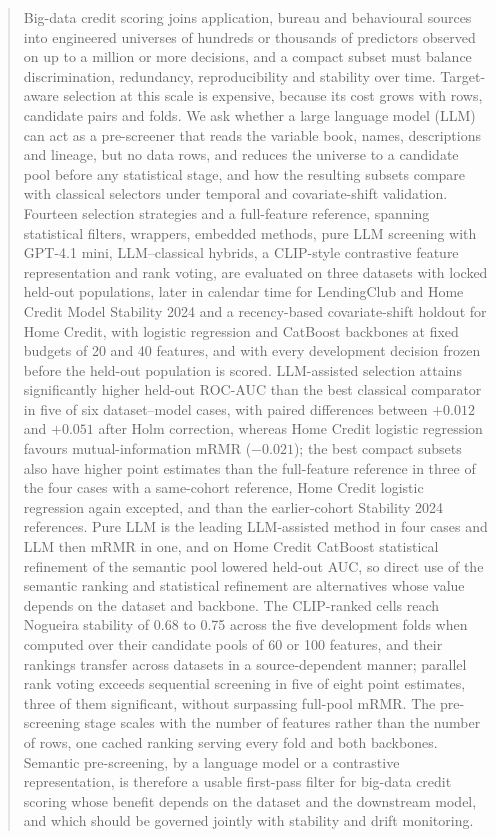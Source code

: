 \documentclass[final,5p,twocolumn]{elsarticle}
\begin{document}
\begin{frontmatter}
\begin{abstract}
Big-data credit scoring joins application, bureau and behavioural sources into engineered universes of hundreds or thousands of predictors observed on up to a million or more decisions, and a compact subset must balance discrimination, redundancy, reproducibility and stability over time. Target-aware selection at this scale is expensive, because its cost grows with rows, candidate pairs and folds. We ask whether a large language model (LLM) can act as a pre-screener that reads the variable book, names, descriptions and lineage, but no data rows, and reduces the universe to a candidate pool before any statistical stage, and how the resulting subsets compare with classical selectors under temporal and covariate-shift validation. Fourteen selection strategies and a full-feature reference, spanning statistical filters, wrappers, embedded methods, pure LLM screening with GPT-4.1 mini, LLM--classical hybrids, a CLIP-style contrastive feature representation and rank voting, are evaluated on three datasets with locked held-out populations, later in calendar time for LendingClub and Home Credit Model Stability 2024 and a recency-based covariate-shift holdout for Home Credit, with logistic regression and CatBoost backbones at fixed budgets of 20 and 40 features, and with every development decision frozen before the held-out population is scored. LLM-assisted selection attains significantly higher held-out ROC-AUC than the best classical comparator in five of six dataset--model cases, with paired differences between $+0.012$ and $+0.051$ after Holm correction, whereas Home Credit logistic regression favours mutual-information mRMR ($-0.021$); the best compact subsets also have higher point estimates than the full-feature reference in three of the four cases with a same-cohort reference, Home Credit logistic regression again excepted, and than the earlier-cohort Stability 2024 references. Pure LLM is the leading LLM-assisted method in four cases and LLM then mRMR in one, and on Home Credit CatBoost statistical refinement of the semantic pool lowered held-out AUC, so direct use of the semantic ranking and statistical refinement are alternatives whose value depends on the dataset and backbone. The CLIP-ranked cells reach Nogueira stability of 0.68 to 0.75 across the five development folds when computed over their candidate pools of 60 or 100 features, and their rankings transfer across datasets in a source-dependent manner; parallel rank voting exceeds sequential screening in five of eight point estimates, three of them significant, without surpassing full-pool mRMR. The pre-screening stage scales with the number of features rather than the number of rows, one cached ranking serving every fold and both backbones. Semantic pre-screening, by a language model or a contrastive representation, is therefore a usable first-pass filter for big-data credit scoring whose benefit depends on the dataset and the downstream model, and which should be governed jointly with stability and drift monitoring.
\end{abstract}


\end{frontmatter}
\end{document}
